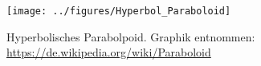 \begin{center}
	\texttt{[image: ../figures/Hyperbol\_Paraboloid]}
\end{center}
{\tiny Hyperbolisches Parabolpoid. Graphik entnommen: \url{https://de.wikipedia.org/wiki/Paraboloid}}\par\medskip




\begin{auf}\cha\label{block1A6b}

\end{auf}












